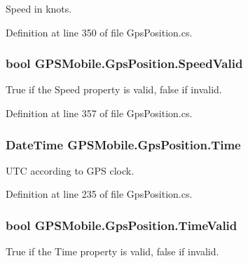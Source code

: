 Speed in knots. 

Definition at line 350 of file GpsPosition.cs.\hypertarget{class_g_p_s_mobile_1_1_gps_position_a2f8d5434c3526194ee0c1ebd42481f2b}{
\subsubsection[{SpeedValid}]{\setlength{\rightskip}{0pt plus 5cm}bool GPSMobile.GpsPosition.SpeedValid}}
\label{class_g_p_s_mobile_1_1_gps_position_a2f8d5434c3526194ee0c1ebd42481f2b}


True if the Speed property is valid, false if invalid. 

Definition at line 357 of file GpsPosition.cs.\hypertarget{class_g_p_s_mobile_1_1_gps_position_a53833ea1f1e4c4ad1c6946c26277a817}{
\subsubsection[{Time}]{\setlength{\rightskip}{0pt plus 5cm}DateTime GPSMobile.GpsPosition.Time}}
\label{class_g_p_s_mobile_1_1_gps_position_a53833ea1f1e4c4ad1c6946c26277a817}


UTC according to GPS clock. 

Definition at line 235 of file GpsPosition.cs.\hypertarget{class_g_p_s_mobile_1_1_gps_position_a54c9d8150b16e5b0020f137532c63210}{
\subsubsection[{TimeValid}]{\setlength{\rightskip}{0pt plus 5cm}bool GPSMobile.GpsPosition.TimeValid}}
\label{class_g_p_s_mobile_1_1_gps_position_a54c9d8150b16e5b0020f137532c63210}


True if the Time property is valid, false if invalid. 

